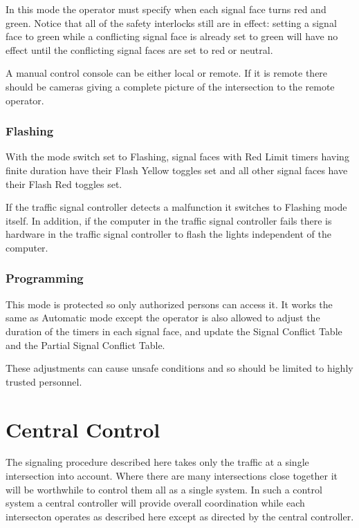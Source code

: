\documentclass[letterpaper,twoside]{article}
\begin{document}
In this mode the operator must specify when each signal face turns
red and green.  Notice that all of the safety interlocks still
are in effect: setting a signal face to green while a conflicting
signal face is already set to green will have no effect until the
conflicting signal faces are set to red or neutral.

A manual control console can be either local or remote.  If it is remote
there should be cameras giving a complete picture of the intersection
to the remote operator.

\subsubsection{Flashing}

With the mode switch set to Flashing, signal faces with Red Limit
timers having finite duration have their Flash Yellow toggles set
and all other signal faces have their Flash Red toggles set.

If the traffic signal controller detects a malfunction it switches
to Flashing mode itself.  In addition, if the computer in the traffic
signal controller fails there is hardware in the traffic signal
controller to flash the lights independent of the computer.

\subsubsection{Programming}

This mode is protected so only authorized persons can access it.
It works the same as Automatic mode except the operator is also allowed to
adjust the duration of the timers in each signal face, and update the
Signal Conflict Table and the Partial Signal Conflict Table.

These adjustments can cause unsafe conditions and so should be limited
to highly trusted personnel.

\section{Central Control}

The signaling procedure described here takes only the traffic at a single
intersection into account.  Where there are many intersections close
together it will be worthwhile to control them all as a single system.
In such a control system a central controller will provide overall
coordination while each intersecton operates as described here except as
directed by the central controller.
\end{document}

